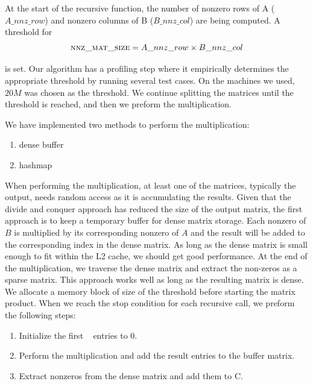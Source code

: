 At the start of the recursive function, the number of nonzero rows of A ($A\_nnz\_row$) and nonzero columns of B ($B\_nnz\_col$) are being computed. A threshold for 
\begin{equation}
    \textsc{nnz\_mat\_size} = A\_nnz\_row \times B\_nnz\_col
\end{equation}

is set. Our algorithm has a profiling step where it empirically determines the appropriate threshold by running several test cases. On the machines we used,  $20M$ was chosen as the threshold. We continue splitting the matrices until the threshold is reached, and then we preform the multiplication.


We have implemented two methods to perform the multiplication: 
\begin{enumerate}
    \item dense buffer
    \item hashmap
\end{enumerate}

When performing the multiplication, at least one of the matrices, typically the output, needs random access as it is accumulating the results. Given that the divide and conquer approach has reduced the size of the output matrix, the first approach is to keep a temporary buffer for dense matrix storage. Each nonzero of $B$ is multiplied by its corresponding nonzero of $A$ and the result will be added to the corresponding index in the dense matrix. As long as the dense matrix is small enough to fit within the L2 cache, we should get good performance. At the end of the multiplication, we traverse the dense matrix and extract the non-zeros as a sparse matrix. This approach works well as long as the resulting matrix is dense. We allocate a memory block of size of the threshold before starting the matrix product. When we reach the stop condition for each recursive call, we preform the following steps:
\begin{enumerate}
    \item Initialize the first \nnzsz~ entries to 0.
    \item Perform the multiplication and add the result entries to the buffer matrix.
    \item Extract nonzeros from the dense matrix and add them to C.
\end{enumerate}

